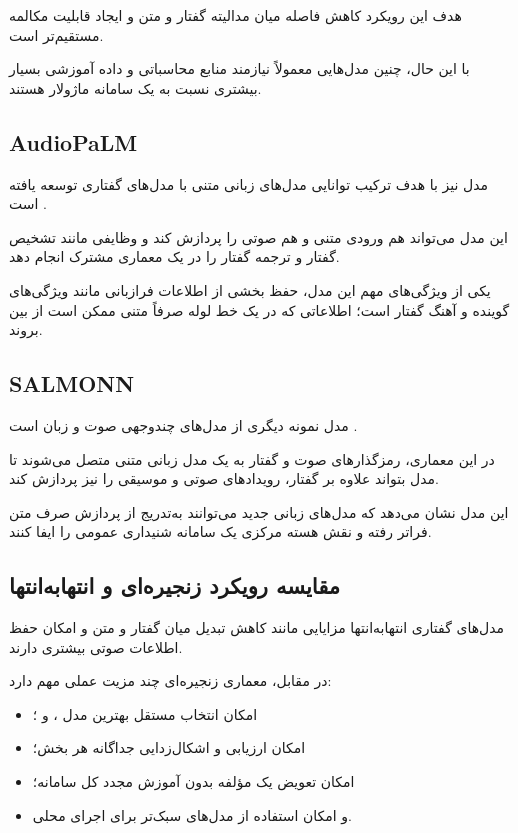 هدف این رویکرد کاهش فاصله میان مدالیته گفتار و متن و ایجاد
قابلیت مکالمه مستقیم‌تر است.

با این حال، چنین مدل‌هایی معمولاً نیازمند منابع محاسباتی و
داده آموزشی بسیار بیشتری نسبت به یک سامانه ماژولار هستند.


\subsection{AudioPaLM}

مدل
نیز با هدف ترکیب توانایی مدل‌های زبانی متنی با مدل‌های گفتاری
توسعه یافته است
\cite{rubenstein2023audiopalm}.

این مدل می‌تواند هم ورودی متنی و هم صوتی را پردازش کند و
وظایفی مانند تشخیص گفتار و ترجمه گفتار را در یک معماری مشترک
انجام دهد.

یکی از ویژگی‌های مهم این مدل، حفظ بخشی از اطلاعات فرازبانی
مانند ویژگی‌های گوینده و آهنگ گفتار است؛ اطلاعاتی که در یک
خط لوله صرفاً متنی ممکن است از بین بروند.


\subsection{SALMONN}

مدل
نمونه دیگری از مدل‌های چندوجهی صوت و زبان است
\cite{tang2023salmonn}.

در این معماری، رمزگذارهای صوت و گفتار به یک مدل زبانی متنی
متصل می‌شوند تا مدل بتواند علاوه بر گفتار، رویدادهای صوتی و
موسیقی را نیز پردازش کند.

این مدل نشان می‌دهد که مدل‌های زبانی جدید می‌توانند به‌تدریج
از پردازش صرف متن فراتر رفته و نقش هسته مرکزی یک سامانه شنیداری
عمومی را ایفا کنند.


\subsection{مقایسه رویکرد زنجیره‌ای و انتهابه‌انتها}

مدل‌های گفتاری انتهابه‌انتها مزایایی مانند کاهش تبدیل میان
گفتار و متن و امکان حفظ اطلاعات صوتی بیشتری دارند.

در مقابل، معماری زنجیره‌ای چند مزیت عملی مهم دارد:

\begin{itemize}

    \item امکان انتخاب مستقل بهترین مدل ،  و ؛
    \item امکان ارزیابی و اشکال‌زدایی جداگانه هر بخش؛
    \item امکان تعویض یک مؤلفه بدون آموزش مجدد کل سامانه؛
    \item و امکان استفاده از مدل‌های سبک‌تر برای اجرای محلی.
\end{itemize}

